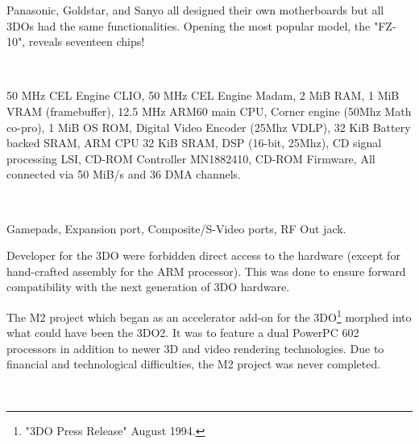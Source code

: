 \par
Panasonic, Goldstar, and Sanyo all designed their own motherboards but all 3DOs had the same functionalities. Opening the most popular model, the "FZ-10", reveals seventeen chips!\\
\par
{}\\
\par
{} 50 MHz CEL Engine CLIO, 
 50 MHz CEL Engine  Madam, 
 2 MiB RAM, 
 1 MiB VRAM (framebuffer), 
 12.5 MHz ARM60 main CPU, 
 Corner engine (50Mhz Math co-pro), 
 1 MiB OS ROM, 
 Digital Video Encoder (25Mhz VDLP), 
 32 KiB Battery backed SRAM,  
 ARM CPU 32 KiB SRAM, 
 DSP (16-bit, 25Mhz), 
 CD signal processing LSI, 
 CD-ROM Controller MN1882410, 
 CD-ROM Firmware, All connected via 50 MiB/s and 36 DMA channels.\\
\par
{}\\
\par
{} Gamepads,
 Expansion port,
 Composite/S-Video ports, 
 RF Out jack. 


\par
Developer for the 3DO were forbidden direct access to the hardware (except for hand-crafted assembly for the ARM processor). This was done to ensure forward compatibility with the next generation of 3DO hardware.\\
\par
 The M2 project which began as an accelerator add-on for the 3DO\footnote{"3DO Press Release" August 1994.} morphed into what could have been the 3DO2. It was to feature a dual PowerPC 602 processors in addition to newer 3D and video rendering technologies. Due to financial and technological difficulties, the M2 project was never completed.\\
\par
{}\\
\pagebreak

